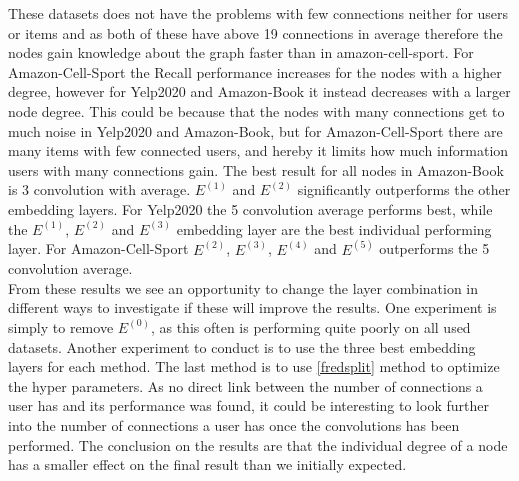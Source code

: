 These datasets does not have the problems with few connections neither for users or items and as both of these have above 19 connections in average therefore the nodes gain knowledge about the graph faster than in amazon-cell-sport.
For Amazon-Cell-Sport the Recall performance increases for the nodes with a higher degree, however for Yelp2020 and Amazon-Book it instead decreases with a larger node degree.
This could be because that the nodes with many connections get to much noise in Yelp2020 and Amazon-Book, but for Amazon-Cell-Sport there are many items with few connected users, and hereby it limits how much information users with many connections gain.
The best result for all nodes in Amazon-Book is 3 convolution with average.
$E^{(1)}$ and $E^{(2)}$ significantly outperforms the other embedding layers.  
For Yelp2020 the 5 convolution average performs best, while the $E^{(1)}$, $E^{(2)}$ and $E^{(3)}$ embedding layer are the best individual performing layer.
For Amazon-Cell-Sport $E^{(2)}$, $E^{(3)}$, $E^{(4)}$ and $E^{(5)}$ outperforms the 5 convolution average.
\\
From these results we see an opportunity to change the layer combination in different ways to investigate if these will improve the results.
One experiment is simply to remove $E^{(0)}$, as this often is performing quite poorly on all used datasets.
Another experiment to conduct is to use the three best embedding layers for each method.
The last method is to use \autoref{fredsplit} method to optimize the hyper parameters.
As no direct link between the number of connections a user has and its performance was found, it could be interesting to look further into the number of connections a user has once the convolutions has been performed. 
The conclusion on the results are that the individual degree of a node has a smaller effect on the final result than we initially expected.


